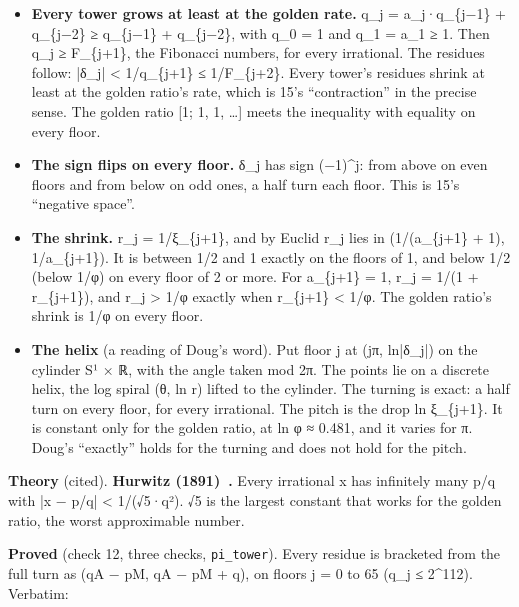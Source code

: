 \begin{itemize}
\item \textbf{Every tower grows at least at the golden rate.} q\_\allowbreak{}j = a\_\allowbreak{}j·q\_\allowbreak{}\{j−1\} + q\_\allowbreak{}\{j−2\} ≥ q\_\allowbreak{}\{j−1\} + q\_\allowbreak{}\{j−2\}, with q\_\allowbreak{}0 = 1 and q\_\allowbreak{}1 = a\_\allowbreak{}1 ≥ 1. Then q\_\allowbreak{}j ≥ F\_\allowbreak{}\{j+1\}, the Fibonacci numbers, for every irrational. The residues follow: |δ\_\allowbreak{}j| < 1/q\_\allowbreak{}\{j+1\} ≤ 1/F\_\allowbreak{}\{j+2\}. Every tower's residues shrink at least at the golden ratio's rate, which is 15's “contraction” in the precise sense. The golden ratio [1; 1, 1, …] meets the inequality with equality on every floor.
\item \textbf{The sign flips on every floor.} δ\_\allowbreak{}j has sign (−1)\textasciicircum{}j: from above on even floors and from below on odd ones, a half turn each floor. This is 15's “negative space”.
\item \textbf{The shrink.} r\_\allowbreak{}j = 1/ξ\_\allowbreak{}\{j+1\}, and by Euclid r\_\allowbreak{}j lies in (1/(a\_\allowbreak{}\{j+1\} + 1), 1/a\_\allowbreak{}\{j+1\}). It is between 1/2 and 1 exactly on the floors of 1, and below 1/2 (below 1/φ) on every floor of 2 or more. For a\_\allowbreak{}\{j+1\} = 1, r\_\allowbreak{}j = 1/(1 + r\_\allowbreak{}\{j+1\}), and r\_\allowbreak{}j > 1/φ exactly when r\_\allowbreak{}\{j+1\} < 1/φ. The golden ratio's shrink is 1/φ on every floor.
\item \textbf{The helix} (a reading of Doug's word). Put floor j at (jπ, ln|δ\_\allowbreak{}j|) on the cylinder S¹ × ℝ, with the angle taken mod 2π. The points lie on a discrete helix, the log spiral (θ, ln r) lifted to the cylinder. The turning is exact: a half turn on every floor, for every irrational. The pitch is the drop ln ξ\_\allowbreak{}\{j+1\}. It is constant only for the golden ratio, at ln φ ≈ 0.481, and it varies for π. Doug's “exactly” holds for the turning and does not hold for the pitch.
\end{itemize}

\textbf{Theory} (cited). \textbf{Hurwitz (1891)~\cite{src:Hurwitz-1891}.} Every irrational x has infinitely many p/q with |x − p/q| < 1/(√5·q²). √5 is the largest constant that works for the golden ratio, the worst approximable number.

\textbf{Proved} (check 12, three checks, \texttt{pi\_\allowbreak{}tower}). Every residue is bracketed from the full turn as (qA − pM, qA − pM + q), on floors j = 0 to 65 (q\_\allowbreak{}j ≤ 2\textasciicircum{}112). Verbatim:

